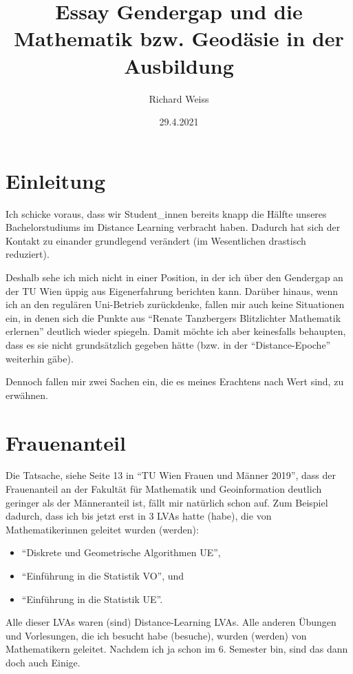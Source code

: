 \documentclass{article}
\title{Essay Gendergap und die Mathematik bzw. Geodäsie in der Ausbildung}
\author{Richard Weiss}
\date{29.4.2021}
\begin{document}
\maketitle

\section*{Einleitung}

Ich schicke voraus, dass wir Student\_innen bereits knapp die Hälfte unseres Bachelorstudiums im Distance Learning verbracht haben.
Dadurch hat sich der Kontakt zu einander grundlegend verändert (im Wesentlichen drastisch reduziert).

Deshalb sehe ich mich nicht in einer Position, in der ich über den Gendergap an der TU Wien üppig aus Eigenerfahrung berichten kann.
Darüber hinaus, wenn ich an den regulären Uni-Betrieb zurückdenke, fallen mir auch keine Situationen ein, in denen sich die Punkte aus \enquote{Renate Tanzbergers Blitzlichter Mathematik erlernen} deutlich wieder spiegeln.
Damit möchte ich aber keinesfalls behaupten, dass es sie nicht grundsätzlich gegeben hätte (bzw. in der \enquote{Distance-Epoche} weiterhin gäbe).

Dennoch fallen mir zwei Sachen ein, die es meines Erachtens nach Wert sind, zu erwähnen.

\section*{Frauenanteil}

Die Tatsache, siehe Seite 13 in \enquote{TU Wien Frauen und Männer 2019}, dass der Frauenanteil an der Fakultät für Mathematik und Geoinformation deutlich geringer als der Männeranteil ist, fällt mir natürlich schon auf.
Zum Beispiel dadurch, dass ich bis jetzt erst in 3 LVAs hatte (habe), die von Mathematikerinnen geleitet wurden (werden):

\begin{itemize}
	\item \enquote{Diskrete und Geometrische Algorithmen UE},
	\item \enquote{Einführung in die Statistik VO}, und
	\item \enquote{Einführung in die Statistik UE}.
\end{itemize}

Alle dieser LVAs waren (sind) Distance-Learning LVAs.
Alle anderen Übungen und Vorlesungen, die ich besucht habe (besuche), wurden (werden) von Mathematikern geleitet.
Nachdem ich ja schon im 6. Semester bin, sind das dann doch auch Einige.
\end{document}

